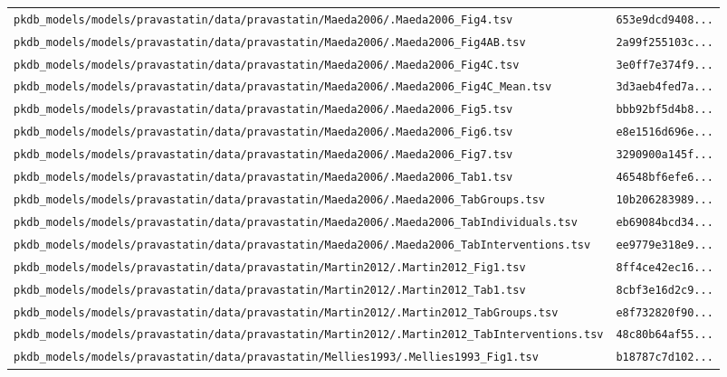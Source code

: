\begin{longtable}{ll}
\texttt{pkdb\_models/models/pravastatin/data/pravastatin/Maeda2006/.Maeda2006\_Fig4.tsv} & \texttt{653e9dcd9408...} \\
\texttt{pkdb\_models/models/pravastatin/data/pravastatin/Maeda2006/.Maeda2006\_Fig4AB.tsv} & \texttt{2a99f255103c...} \\
\texttt{pkdb\_models/models/pravastatin/data/pravastatin/Maeda2006/.Maeda2006\_Fig4C.tsv} & \texttt{3e0ff7e374f9...} \\
\texttt{pkdb\_models/models/pravastatin/data/pravastatin/Maeda2006/.Maeda2006\_Fig4C\_Mean.tsv} & \texttt{3d3aeb4fed7a...} \\
\texttt{pkdb\_models/models/pravastatin/data/pravastatin/Maeda2006/.Maeda2006\_Fig5.tsv} & \texttt{bbb92bf5d4b8...} \\
\texttt{pkdb\_models/models/pravastatin/data/pravastatin/Maeda2006/.Maeda2006\_Fig6.tsv} & \texttt{e8e1516d696e...} \\
\texttt{pkdb\_models/models/pravastatin/data/pravastatin/Maeda2006/.Maeda2006\_Fig7.tsv} & \texttt{3290900a145f...} \\
\texttt{pkdb\_models/models/pravastatin/data/pravastatin/Maeda2006/.Maeda2006\_Tab1.tsv} & \texttt{46548bf6efe6...} \\
\texttt{pkdb\_models/models/pravastatin/data/pravastatin/Maeda2006/.Maeda2006\_TabGroups.tsv} & \texttt{10b206283989...} \\
\texttt{pkdb\_models/models/pravastatin/data/pravastatin/Maeda2006/.Maeda2006\_TabIndividuals.tsv} & \texttt{eb69084bcd34...} \\
\texttt{pkdb\_models/models/pravastatin/data/pravastatin/Maeda2006/.Maeda2006\_TabInterventions.tsv} & \texttt{ee9779e318e9...} \\
\texttt{pkdb\_models/models/pravastatin/data/pravastatin/Martin2012/.Martin2012\_Fig1.tsv} & \texttt{8ff4ce42ec16...} \\
\texttt{pkdb\_models/models/pravastatin/data/pravastatin/Martin2012/.Martin2012\_Tab1.tsv} & \texttt{8cbf3e16d2c9...} \\
\texttt{pkdb\_models/models/pravastatin/data/pravastatin/Martin2012/.Martin2012\_TabGroups.tsv} & \texttt{e8f732820f90...} \\
\texttt{pkdb\_models/models/pravastatin/data/pravastatin/Martin2012/.Martin2012\_TabInterventions.tsv} & \texttt{48c80b64af55...} \\
\texttt{pkdb\_models/models/pravastatin/data/pravastatin/Mellies1993/.Mellies1993\_Fig1.tsv} & \texttt{b18787c7d102...} \\

\end{longtable}
